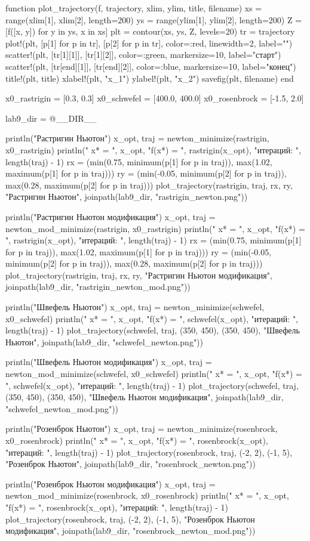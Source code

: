 \documentclass[a4paper, 14pt]{extarticle}
\begin{document}
\begin{breakablelisting}
function plot_trajectory(f, trajectory, xlim, ylim, title, filename)
    xs = range(xlim[1], xlim[2], length=200)
    ys = range(ylim[1], ylim[2], length=200)
    Z = [f([x, y]) for y in ys, x in xs]
    plt = contour(xs, ys, Z, levels=20)
    tr = trajectory
    plot!(plt, [p[1] for p in tr], [p[2] for p in tr], color=:red, linewidth=2, label="")
    scatter!(plt, [tr[1][1]], [tr[1][2]], color=:green, markersize=10, label="старт")
    scatter!(plt, [tr[end][1]], [tr[end][2]], color=:blue, markersize=10, label="конец")
    title!(plt, title)
    xlabel!(plt, "x_1")
    ylabel!(plt, "x_2")
    savefig(plt, filename)
end

x0_rastrigin = [0.3, 0.3]
x0_schwefel = [400.0, 400.0]
x0_rosenbrock = [-1.5, 2.0]

lab9_dir = @__DIR__

println("Растригин Ньютон")
x_opt, traj = newton_minimize(rastrigin, x0_rastrigin)
println("  x* = ", x_opt, "\n  f(x*) = ", rastrigin(x_opt), "\n  итераций: ", length(traj) - 1)
rx = (min(0.75, minimum(p[1] for p in traj)), max(1.02, maximum(p[1] for p in traj)))
ry = (min(-0.05, minimum(p[2] for p in traj)), max(0.28, maximum(p[2] for p in traj)))
plot_trajectory(rastrigin, traj, rx, ry, "Растригин Ньютон", joinpath(lab9_dir, "rastrigin_newton.png"))

println("Растригин Ньютон модификация")
x_opt, traj = newton_mod_minimize(rastrigin, x0_rastrigin)
println("  x* = ", x_opt, "\n  f(x*) = ", rastrigin(x_opt), "\n  итераций: ", length(traj) - 1)
rx = (min(0.75, minimum(p[1] for p in traj)), max(1.02, maximum(p[1] for p in traj)))
ry = (min(-0.05, minimum(p[2] for p in traj)), max(0.28, maximum(p[2] for p in traj)))
plot_trajectory(rastrigin, traj, rx, ry, "Растригин Ньютон модификация", joinpath(lab9_dir, "rastrigin_newton_mod.png"))

println("Швефель Ньютон")
x_opt, traj = newton_minimize(schwefel, x0_schwefel)
println("  x* = ", x_opt, "\n  f(x*) = ", schwefel(x_opt), "\n  итераций: ", length(traj) - 1)
plot_trajectory(schwefel, traj, (350, 450), (350, 450), "Швефель Ньютон", joinpath(lab9_dir, "schwefel_newton.png"))

println("Швефель Ньютон модификация")
x_opt, traj = newton_mod_minimize(schwefel, x0_schwefel)
println("  x* = ", x_opt, "\n  f(x*) = ", schwefel(x_opt), "\n  итераций: ", length(traj) - 1)
plot_trajectory(schwefel, traj, (350, 450), (350, 450), "Швефель Ньютон модификация", joinpath(lab9_dir, "schwefel_newton_mod.png"))

println("Розенброк Ньютон")
x_opt, traj = newton_minimize(rosenbrock, x0_rosenbrock)
println("  x* = ", x_opt, "\n  f(x*) = ", rosenbrock(x_opt), "\n  итераций: ", length(traj) - 1)
plot_trajectory(rosenbrock, traj, (-2, 2), (-1, 5), "Розенброк Ньютон", joinpath(lab9_dir, "rosenbrock_newton.png"))

println("Розенброк Ньютон модификация")
x_opt, traj = newton_mod_minimize(rosenbrock, x0_rosenbrock)
println("  x* = ", x_opt, "\n  f(x*) = ", rosenbrock(x_opt), "\n  итераций: ", length(traj) - 1)
plot_trajectory(rosenbrock, traj, (-2, 2), (-1, 5), "Розенброк Ньютон модификация", joinpath(lab9_dir, "rosenbrock_newton_mod.png"))
\end{breakablelisting}
\end{document}
